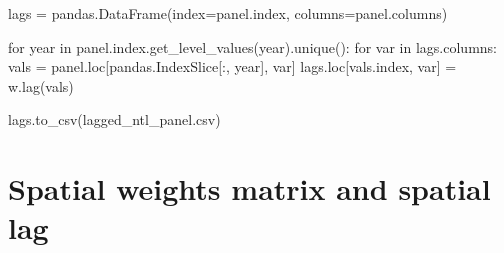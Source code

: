 \documentclass[
  letterpaper,
  DIV=11,
  numbers=noendperiod]{scrreprt}
\newenvironment{Shaded}{\begin{snugshade}}{\end{snugshade}}
\newcommand{\ControlFlowTok}[1]{\textcolor[rgb]{0.00,0.23,0.31}{#1}}
\newcommand{\KeywordTok}[1]{\textcolor[rgb]{0.00,0.23,0.31}{#1}}
\newcommand{\NormalTok}[1]{\textcolor[rgb]{0.00,0.23,0.31}{#1}}
\newcommand{\OperatorTok}[1]{\textcolor[rgb]{0.37,0.37,0.37}{#1}}
\newcommand{\StringTok}[1]{\textcolor[rgb]{0.13,0.47,0.30}{#1}}
\begin{document}
\begin{Shaded}
\begin{Highlighting}[]
\NormalTok{lags }\OperatorTok{=}\NormalTok{ pandas.DataFrame(index}\OperatorTok{=}\NormalTok{panel.index, columns}\OperatorTok{=}\NormalTok{panel.columns)}

\ControlFlowTok{for}\NormalTok{ year }\KeywordTok{in}\NormalTok{ panel.index.get\_level\_values(}\StringTok{\textquotesingle{}year\textquotesingle{}}\NormalTok{).unique():}
    \ControlFlowTok{for}\NormalTok{ var }\KeywordTok{in}\NormalTok{ lags.columns:}
\NormalTok{        vals }\OperatorTok{=}\NormalTok{ panel.loc[pandas.IndexSlice[:, year], var]}
\NormalTok{        lags.loc[vals.index, var] }\OperatorTok{=}\NormalTok{ w.lag(vals)}
\end{Highlighting}
\end{Shaded}

\begin{Shaded}
\begin{Highlighting}[]
\NormalTok{lags.to\_csv(}\StringTok{\textquotesingle{}lagged\_ntl\_panel.csv\textquotesingle{}}\NormalTok{)}
\end{Highlighting}
\end{Shaded}


\chapter{Spatial weights matrix and spatial
lag}\label{spatial-weights-matrix-and-spatial-lag}
\end{document}
